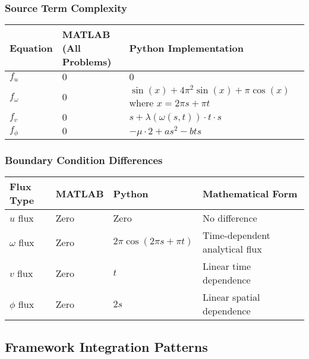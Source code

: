 \subsubsection{Source Term Complexity}

\begin{longtable}{|p{2cm}|p{5cm}|p{6cm}|}
\hline
\textbf{Equation} & \textbf{MATLAB (All Problems)} & \textbf{Python Implementation} \\
\hline
\endhead

$f_u$ & $0$ & $0$ \\
\hline

$f_\omega$ & $0$ & $\sin(x) + 4\pi^2\sin(x) + \pi\cos(x)$ where $x = 2\pi s + \pi t$ \\
\hline

$f_v$ & $0$ & $s + \lambda(\omega(s,t)) \cdot t \cdot s$ \\
\hline

$f_\phi$ & $0$ & $-\mu \cdot 2 + a s^2 - b t s$ \\
\hline

\end{longtable}

\subsubsection{Boundary Condition Differences}

\begin{longtable}{|p{2.5cm}|p{3cm}|p{3cm}|p{4.5cm}|}
\hline
\textbf{Flux Type} & \textbf{MATLAB} & \textbf{Python} & \textbf{Mathematical Form} \\
\hline
\endhead

$u$ flux & Zero & Zero & No difference \\
\hline

$\omega$ flux & Zero & $2\pi\cos(2\pi s + \pi t)$ & Time-dependent analytical flux \\
\hline

$v$ flux & Zero & $t$ & Linear time dependence \\
\hline

$\phi$ flux & Zero & $2s$ & Linear spatial dependence \\
\hline

\end{longtable}

\subsection{Framework Integration Patterns}
\label{subsec:framework_integration_patterns}

